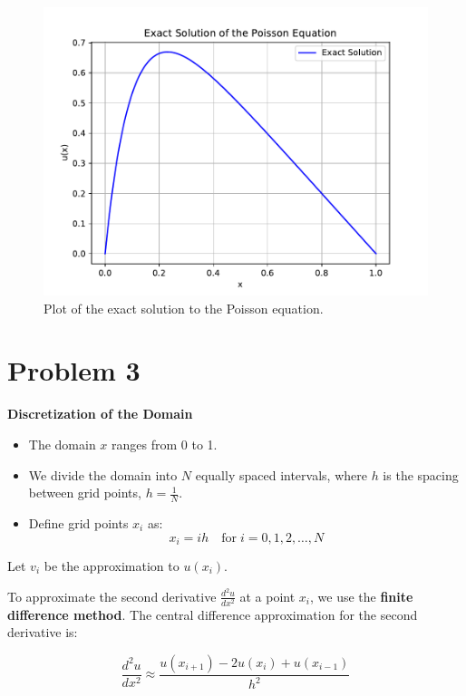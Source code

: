 \documentclass[english,notitlepage]{revtex4-1}  %
\begin{document}
\begin{figure}%
    \centering %
    \includegraphics[scale=0.75]{problem2/poisson_solution_plot.pdf} %
    \caption{Plot of the exact solution to the Poisson equation.} %
    \label{fig:poisson_exact} %
\end{figure}

\section*{Problem 3}
\textbf{Discretization of the Domain}

\begin{itemize}
    \item The domain $x$ ranges from 0 to 1.
    \item We divide the domain into $N$ equally spaced intervals, where $h$ is the spacing between grid points, $h = \frac{1}{N}$.
    \item Define grid points $x_i$ as:
          $$ x_i = i h \quad \text{for} \; i = 0, 1, 2, \ldots, N $$
\end{itemize}

Let $v_i$ be the approximation to $u(x_i)$.

To approximate the second derivative $\frac{d^2 u}{dx^2}$ at a point $x_i$, we use the \textbf{finite difference method}. The central difference approximation for the second derivative is:

$$
    \frac{d^2 u}{dx^2} \approx \frac{u(x_{i+1}) - 2 u(x_i) + u(x_{i-1})}{h^2}
$$
\end{document}
